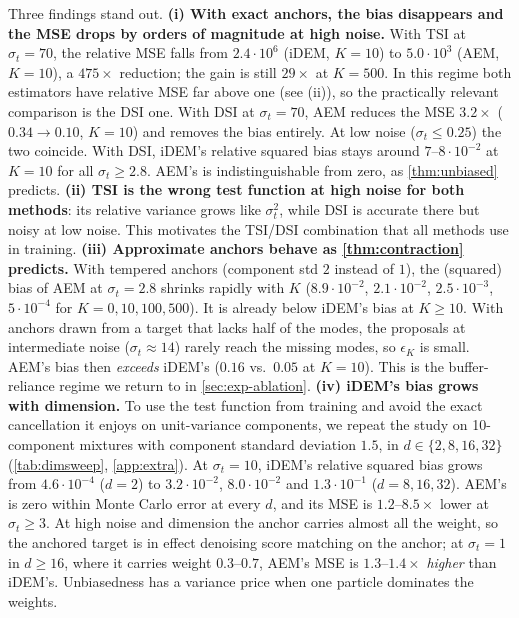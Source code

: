 Three findings stand out.
\textbf{(i) With exact anchors, the bias disappears and the MSE drops by orders of magnitude at high noise.}
With TSI at $\sigma_t=70$, the relative MSE falls from $2.4\cdot10^6$ (iDEM, $K=10$) to $5.0\cdot10^3$ (AEM, $K=10$), a $475\times$ reduction; the gain is still $29\times$ at $K=500$. In this regime both estimators have relative MSE far above one (see (ii)), so the practically relevant comparison is the DSI one. With DSI at $\sigma_t=70$, AEM reduces the MSE $3.2\times$ ($0.34\to0.10$, $K=10$) and removes the bias entirely.
At low noise ($\sigma_t\le0.25$) the two coincide.
With DSI, iDEM's relative squared bias stays around $7$--$8\cdot10^{-2}$ at $K=10$ for all $\sigma_t\ge2.8$. AEM's is indistinguishable from zero, as \cref{thm:unbiased} predicts.
\textbf{(ii) TSI is the wrong test function at high noise for both methods}: its relative variance grows like $\sigma_t^2$, while DSI is accurate there but noisy at low noise. This motivates the TSI/DSI combination that all methods use in training.
\textbf{(iii) Approximate anchors behave as \cref{thm:contraction} predicts.} With tempered anchors (component std $2$ instead of $1$), the (squared) bias of AEM at $\sigma_t=2.8$ shrinks rapidly with $K$ ($8.9\cdot10^{-2}$, $2.1\cdot10^{-2}$, $2.5\cdot10^{-3}$, $5\cdot10^{-4}$ for $K=0,10,100,500$). It is already below iDEM's bias at $K\ge10$.
With anchors drawn from a target that lacks half of the modes, the proposals at intermediate noise ($\sigma_t\approx14$) rarely reach the missing modes, so $\epsilon_K$ is small. AEM's bias then \emph{exceeds} iDEM's ($0.16$ vs.\ $0.05$ at $K=10$). This is the buffer-reliance regime we return to in \cref{sec:exp-ablation}.
\textbf{(iv) iDEM's bias grows with dimension.} To use the test function from training and avoid the exact cancellation it enjoys on unit-variance components, we repeat the study on 10-component mixtures with component standard deviation $1.5$, in $d\in\{2,8,16,32\}$ (\cref{tab:dimsweep}, \cref{app:extra}).
At $\sigma_t=10$, iDEM's relative squared bias grows from $4.6\cdot10^{-4}$ ($d=2$) to $3.2\cdot10^{-2}$, $8.0\cdot10^{-2}$ and $1.3\cdot10^{-1}$ ($d=8,16,32$). AEM's is zero within Monte Carlo error at every $d$, and its MSE is $1.2$--$8.5\times$ lower at $\sigma_t\ge3$.
At high noise and dimension the anchor carries almost all the weight, so the anchored target is in effect denoising score matching on the anchor; at $\sigma_t=1$ in $d\ge16$, where it carries weight $0.3$--$0.7$, AEM's MSE is $1.3$--$1.4\times$ \emph{higher} than iDEM's. Unbiasedness has a variance price when one particle dominates the weights.
